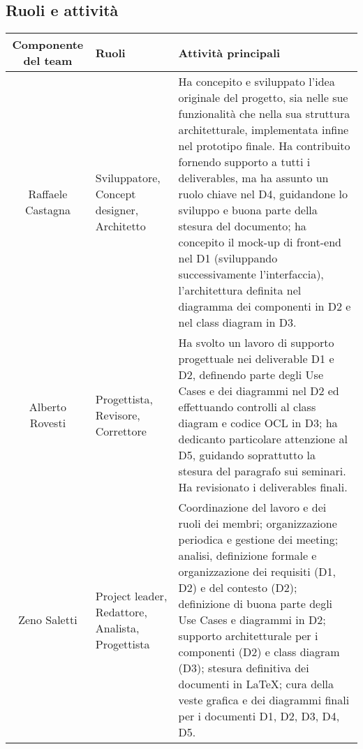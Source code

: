 \documentclass[11pt, a4paper]{article}
\theoremstyle{definition}
\begin{document}
\subsection{Ruoli e attività}
\begin{center}
  \footnotesize
  \begin{tabularx}{\textwidth}{|c||X||X|}
      \hline
      \cellcolor{red!70}Componente del team & \cellcolor{red!70}Ruoli & \cellcolor{red!70}Attività principali\\
      \hline
      Raffaele Castagna & Sviluppatore, Concept designer, Architetto& Ha concepito e sviluppato l'idea originale del progetto, sia nelle sue funzionalità che nella sua struttura architetturale, implementata infine nel prototipo finale. Ha contribuito fornendo supporto a tutti i deliverables, ma ha assunto un ruolo chiave nel D4, guidandone lo sviluppo e buona parte della stesura del documento; ha concepito il mock-up di front-end nel D1 (sviluppando successivamente l'interfaccia), l'architettura definita nel diagramma dei componenti in D2 e nel class diagram in D3.\\
      \hline
      Alberto Rovesti & Progettista, Revisore, Correttore & Ha svolto un lavoro di supporto progettuale nei deliverable D1 e D2, definendo parte degli Use Cases e dei diagrammi nel D2 ed effettuando controlli al class diagram e codice OCL in D3; ha dedicanto particolare attenzione al D5, guidando soprattutto la stesura del paragrafo sui seminari. Ha revisionato i deliverables finali.\\
      \hline
      Zeno Saletti & Project leader, Redattore, Analista, Progettista & Coordinazione del lavoro e dei ruoli dei membri; organizzazione periodica e gestione dei meeting; analisi, definizione formale e organizzazione dei requisiti (D1, D2) e del contesto (D2); definizione di buona parte degli Use Cases e diagrammi in D2; supporto architetturale per i componenti (D2) e class diagram (D3); stesura definitiva dei documenti in \LaTeX; cura della veste grafica e dei diagrammi finali per i documenti D1, D2, D3, D4, D5.\\
      \hline
  \end{tabularx}
\end{center}
\end{document}
